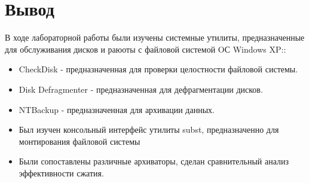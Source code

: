 \section{Вывод}
В ходе лабораторной работы были изучены системные утилиты, предназначенные для обслуживания дисков и раюоты с файловой системой OС Windows XP::
\begin{itemize}
\item
  CheckDisk - предназначенная для проверки целостности файловой системы.
\item
  Disk Defragmenter - предназначенная для дефрагментации дисков.
\item
  NTBackup - предназначенная для архивации данных.
\item
  Был изучен консольный интерфейс утилиты subst, предназначенно для монтирования файловой системы
\item
  Были сопоставлены различные архиваторы, сделан сравнительный анализ эффективности сжатия.

\end{itemize}
\clearpage
